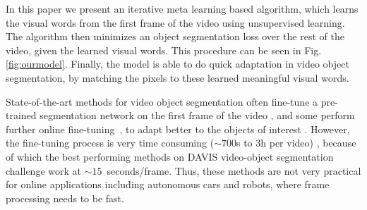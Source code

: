 \documentclass[10pt,twocolumn,letterpaper]{article}
\begin{document}
In this paper we present an iterative meta learning based algorithm, which learns the visual words from the first frame of the video using unsupervised learning. The algorithm then minimizes an object segmentation loss over the rest of the video, given the learned visual words.
This procedure can be seen in Fig. \ref{fig:ourmodel}.
Finally, the model is able to do quick adaptation in video object segmentation, by matching the pixels to these learned meaningful visual words.


State-of-the-art methods for video object segmentation often fine-tune a pre-trained segmentation network on the first frame of the video \cite{OSVOS,onavos,masktrack,Bao_2018_CVPR,Li_2018_ECCV}, and some perform further online fine-tuning~\cite{onavos}, to adapt better to the objects of interest .
However, the fine-tuning process is very time consuming ($\sim 700$s to $3$h per video) \cite{OSVOS,lucid}, because of which the best performing methods on DAVIS video-object segmentation challenge \cite{davis_2017, Caelles_arXiv_2018} work at $\sim 15$~seconds/frame.
Thus, these methods are not very practical for online applications including autonomous cars and robots, where frame processing needs to be fast.

\end{document}
